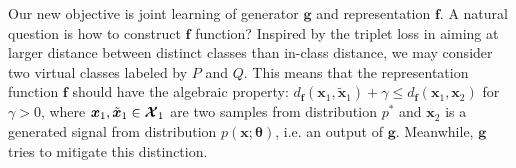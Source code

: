 Our new objective is joint learning of generator $\bm{g}$ and representation $\bm{f}$. A natural question is how to construct $\bm{f}$ function? {Inspired by the triplet loss in \cite{7298682} aiming at larger distance between distinct classes than in-class distance, we may consider two virtual classes labeled by $P$ and $Q$.
This means that the representation function $\bm{f}$ should have the algebraic property: $ d_{\bm{f}}(\bm{x}_1, \tilde{\bm{x}}_1) + \gamma \leq d_{\bm{f}}(\bm{x}_1, \bm{x}_2) $ for $\gamma > 0$, where $\bm{x}_1, \tilde{\bm{x}}_1 \in \bm{\mathcal{X}}_1$ are two samples from distribution $p^{\ast}$ and $\bm{x}_2$ is a generated signal from distribution $p(\bm{x};\bm{\theta})$, i.e. an output of $\bm{g}$. Meanwhile, $\bm{g}$ tries to mitigate this distinction.}

